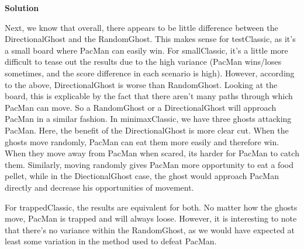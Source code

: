 \documentclass[11pt]{article}
\newcounter{AnswerCounter}
\newcounter{SubAnswerCounter}
\newenvironment{answer}[0]{
  \setcounter{SubAnswerCounter}{1}
  \bigskip
  \textbf{Solution \arabic{AnswerCounter}}
  \\
  \begin{small}
}{
  \end{small}
  \stepcounter{AnswerCounter}
}
\begin{document}
\begin{answer}
Next, we know that overall, there appears to be little difference between the DirectionalGhost and the RandomGhost. This makes sense for testClassic, as it's a small board where PacMan can easily win. For smallClassic, it's a little more difficult to tease out the results due to the high variance (PacMan wins/loses sometimes, and the score difference in each scenario is high). However, according to the above, DirectionalGhost is worse than RandomGhost. Looking at the board, this is explicable by the fact that there aren't many paths through which PacMan can move. So a RandomGhost or a DirectionalGhost will approach PacMan in a similar fashion. In minimaxClassic, we have three ghosts attacking PacMan. Here, the benefit of the DirectionalGhost is more clear cut. When the ghosts move randomly, PacMan can eat them more easily and therefore win. When they move away from PacMan when scared, its harder for PacMan to catch them. Similarly, moving randomly gives PacMan more opportunity to eat a food pellet, while in the DiectionalGhost case, the ghost would approach PacMan directly and decrease his opportunities of movement.

For trappedClassic, the results are equivalent for both. No matter how the ghosts move, PacMan is trapped and will always loose. However, it is interesting to note that there's no variance within the RandomGhost, as we would have expected at least some variation in the method used to defeat PacMan.

\end{answer}
\end{document}
